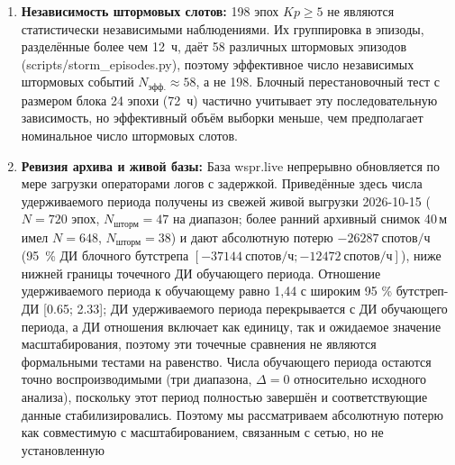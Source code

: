 \documentclass{agujournal2019}
\begin{document}
\begin{enumerate}
	      чего свой отобранный час потеряли 429 из 4\,349
	      покрытых эпох (9,9\%; из них 326 — штормовые или спокойные:
	      $N_{\mbox{шторм}}$ 198 $\rightarrow$ 169,
	      $N_{\mbox{спокойн}}$ 3035 $\rightarrow$ 2738), осталось 3\,920
	      анализируемых эпох (169 штормовых + 2\,738 спокойных +
	      1\,013 промежуточных $3 \le Kp < 5$).
	      Суммарные снижения сдвигаются лишь на 1--3~п.п., а все $p$-значения
	      остаются на нижней границе перестановочного теста, поэтому
	      авроральный градиент не является артефактом вспышек (SID);
	      уменьшенная выборка эпох снижает мощность для вторичных
	      попарных сравнений бинов $Kp$.
	\item \textbf{Независимость штормовых слотов:} 198 эпох $Kp \ge 5$
	      не являются статистически независимыми наблюдениями. Их
	      группировка в эпизоды, разделённые более чем 12~ч, даёт 58
	      различных штормовых эпизодов (scripts/storm\_episodes.py), поэтому
	      эффективное число независимых штормовых событий
	      $N_{\mbox{эфф.}} \approx 58$, а не 198. Блочный перестановочный
	      тест с размером блока 24 эпохи (72~ч) частично учитывает эту
	      последовательную зависимость, но эффективный объём выборки меньше,
	      чем предполагает номинальное число штормовых слотов.
	\item \textbf{Ревизия архива и живой базы:} База wspr.live
	      непрерывно обновляется по мере загрузки операторами логов с задержкой. Приведённые здесь числа
	      удерживаемого периода получены из свежей живой выгрузки 2026-10-15
	      ($N = 720$ эпох, $N_{\mbox{шторм}} = 47$ на диапазон; более ранний
	      архивный снимок 40\,м имел $N = 648$, $N_{\mbox{шторм}} = 38$)
	      и дают абсолютную потерю $\SI{-26287}{\mbox{спотов/ч}}$ (95~\% ДИ блочного
	      бутстрепа $[-\SI{37144}{\mbox{спотов/ч}}; -\SI{12472}{\mbox{спотов/ч}}]$), ниже
	      нижней границы точечного ДИ обучающего периода. Отношение удерживаемого периода к обучающему равно 1,44 с широким 95 \% бутстреп-ДИ
	      [\num{0.65}; \num{2.33}]; ДИ удерживаемого периода перекрывается с ДИ обучающего периода,
	      а ДИ отношения включает как единицу, так и ожидаемое значение
	      масштабирования, поэтому эти точечные сравнения не являются
	      формальными тестами на равенство. Числа обучающего периода
	      остаются точно воспроизводимыми (три диапазона, $\Delta = 0$
	      относительно исходного анализа), поскольку этот период полностью завершён и соответствующие данные стабилизировались. Поэтому мы рассматриваем абсолютную потерю как совместимую
	      с масштабированием, связанным с сетью, но не установленную

\end{enumerate}
\end{document}
